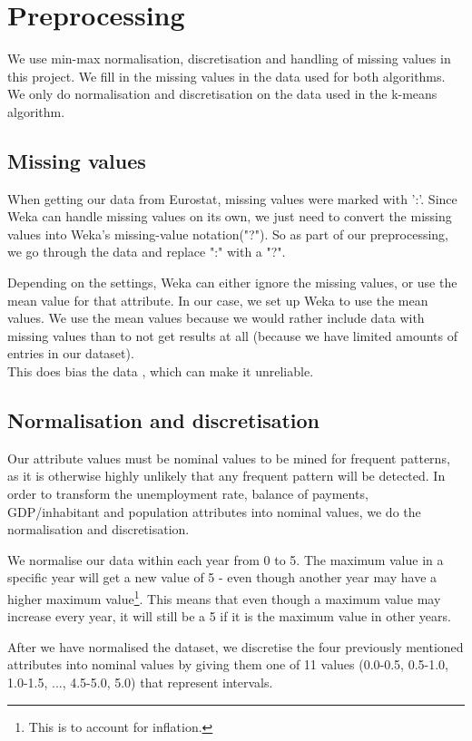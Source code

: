 \section{Preprocessing}
\label{PreP}
We use min-max normalisation, discretisation and handling of missing values in this project. We fill in the missing values in the data used for both algorithms. We only do normalisation and discretisation on the data used in the k-means algorithm.

\subsection{Missing values}
When getting our data from Eurostat, missing values were marked with ':'. Since Weka can handle missing values on its own, we just need to convert the missing values into Weka's missing-value notation("?"). So as part of our preprocessing, we go through the data and replace ":" with a "?".

Depending on the settings, Weka can either ignore the missing values, or use the mean value for that attribute. In our case, we set up Weka to use the mean values. We use the mean values because we would rather include data with missing values than to not get results at all (because we have limited amounts of entries in our dataset). 
\\This does bias the data \cite[p. ~90]{DataMining}, which can make it unreliable.

\subsection{Normalisation and discretisation}
Our attribute values must be nominal values to be mined for frequent patterns, as it is otherwise highly unlikely that any frequent pattern will be detected. In order to transform the unemployment rate, balance of payments, GDP/inhabitant and population attributes into nominal values, we do the normalisation and discretisation.

We normalise our data within each year from 0 to 5. The maximum value in a specific year will get a new value of 5 - even though another year may have a higher maximum value\footnote{This is to account for inflation.}. This means that even though a maximum value may increase every year, it will still be a 5 if it is the maximum value in other years.

After we have normalised the dataset, we discretise the four previously mentioned attributes into nominal values by giving them one of 11 values (0.0-0.5, 0.5-1.0, 1.0-1.5, ..., 4.5-5.0, 5.0) that represent intervals.